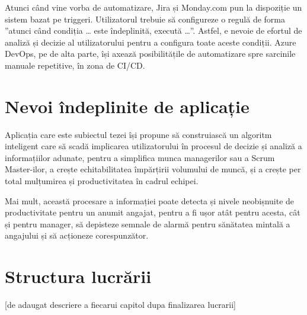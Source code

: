 Atunci când vine vorba de automatizare, Jira și Monday.com pun la dispoziție un sistem bazat pe triggeri. Utilizatorul trebuie să configureze o regulă de forma ”atunci când condiția … este îndeplinită, execută …”. Astfel, e nevoie de efortul de analiză și decizie al utilizatorului pentru a configura toate aceste condiții. Azure DevOps, pe de alta parte, își axează posibilitățile de automatizare spre sarcinile manuale repetitive, în zona de CI/CD.

\section{Nevoi îndeplinite de aplicație}

Aplicația care este subiectul tezei își propune să construiască un algoritm inteligent care să scadă implicarea utilizatorului în procesul de decizie și analiză a informațiilor adunate, pentru a simplifica munca managerilor sau a Scrum Master-ilor, a crește echitabilitatea împărțirii volumului de muncă, și a crește per total mulțumirea și productivitatea în cadrul echipei.

Mai mult, această procesare a informației poate detecta și nivele neobișnuite de productivitate pentru un anumit angajat, pentru a fi ușor atât pentru acesta, cât și pentru manager, să depisteze semnale de alarmă pentru sănătatea mintală a angajului și să acționeze corespunzător.

\section{Structura lucrării}

[de adaugat descriere a fiecarui capitol dupa finalizarea lucrarii]